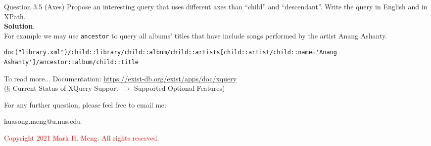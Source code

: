 \begin{frame}[fragile]{Question 3.5 (Axes)}
Propose an interesting query that uses different axes than ``child'' and ``descendant''. Write the query in English and in XPath.\\\vspace{10pt}
\textbf{Solution}: \\
For example we may use \texttt{ancestor} to query all albums' titles that have include songs performed by the artist Anang Ashanty.
\begin{lstlisting}[style=xml-small-nomargin]
doc("library.xml")/child::library/child::album/child::artists[child::artist/child::name='Anang Ashanty']/ancestor::album/child::title
\end{lstlisting}\vspace{5pt}

\begin{block}{To read more...}
	Documentation: \url{https://exist-db.org/exist/apps/doc/xquery} \\
	($\mathsection$ Current Status of XQuery Support $\rightarrow$ Supported Optional Features)
\end{block}	
\end{frame}

\begin{frame}{}
	\centering  
	For any further question, please feel free to email me:\vspace{10pt}
	
	huasong.meng@u.nus.edu \vspace{20pt}
	
	\begin{tcolorbox}
		\begin{center}
			\textcolor{red}{Copyright 2021 Mark H. Meng. All rights reserved.}
		\end{center}
	\end{tcolorbox}
\end{frame}